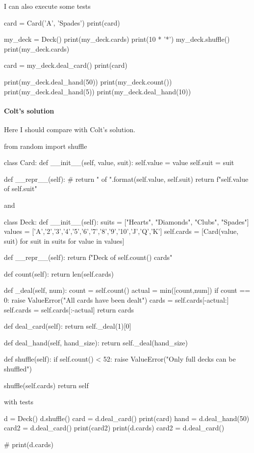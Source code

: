 I can also execute some tests
\begin{listingcont}

card = Card('A', 'Spades')
print(card)

my_deck = Deck()
print(my_deck.cards)
print(10 * '*')
my_deck.shuffle()
print(my_deck.cards)

card = my_deck.deal_card()
print(card)

print(my_deck.deal_hand(50))
print(my_deck.count())
print(my_deck.deal_hand(5))
print(my_deck.deal_hand(10))    
\end{listingcont}


\paragraph{Colt's solution}

Here I should compare with Colt's solution. 
\begin{listing}{1}
from random import shuffle

class Card:
    def __init__(self, value, suit):
        self.value = value
        self.suit = suit

    def __repr__(self):
        # return "{} of {}".format(self.value, self.suit)
        return f"{self.value} of {self.suit}"    
\end{listing}
and 
\begin{listingcont}
class Deck:
	def __init__(self):
		suits = ["Hearts", "Diamonds", "Clubs", "Spades"]
		values = ['A','2','3','4','5','6','7','8','9','10','J','Q','K']
		self.cards = [Card(value, suit) for suit in suits for value in values]

	def __repr__(self):
		return f"Deck of {self.count()} cards"

	def count(self):
		return len(self.cards)

	def _deal(self, num):
		count = self.count()
		actual = min([count,num])
		if count == 0:
			raise ValueError("All cards have been dealt")
		cards = self.cards[-actual:]
		self.cards = self.cards[:-actual]
		return cards

	def deal_card(self):
		return self._deal(1)[0]

	def deal_hand(self, hand_size):
		return self._deal(hand_size)

	def shuffle(self):
		if self.count() < 52:
			raise ValueError("Only full decks can be shuffled")

		shuffle(self.cards)
		return self    
\end{listingcont}
with tests
\begin{listingcont}

d = Deck()
d.shuffle()
card = d.deal_card()
print(card)
hand = d.deal_hand(50)
card2 = d.deal_card()
print(card2)
print(d.cards)
card2 = d.deal_card()

# print(d.cards)
\end{listingcont}



